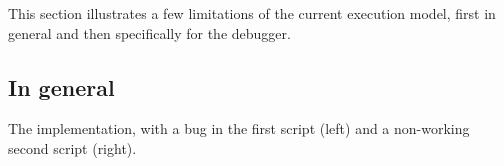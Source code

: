 \documentclass[../main]{subfiles}
\begin{document}
This section illustrates a few limitations of the current execution model, first in general and then specifically for the debugger.

\subsection{In general}\label{subsec:in-general}

\begin{listing}
    \centering
    \begin{scratch}[scale=0.6]
    \end{scratch}
    \hspace{3em}
    \begin{scratch}[scale=0.6]
    \end{scratch}
    \caption{The implementation, with a bug in the first script (left) and a non-working second script (right).}
    \label{lst:star-model-implementation}
\end{listing}
\end{document}
